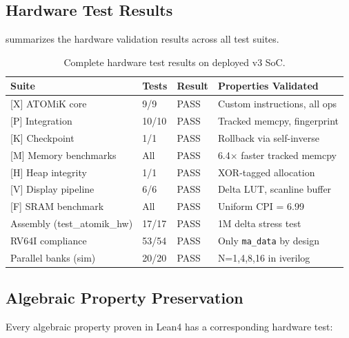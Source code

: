 \documentclass[11pt,letterpaper]{article}
\theoremstyle{plain}
\theoremstyle{definition}
\theoremstyle{remark}
\begin{document}
\subsection{Hardware Test Results}

 summarizes the hardware validation results across all test suites.

\begin{table}[!htbp]
\centering
\caption{Complete hardware test results on deployed v3 SoC.}
\label{tab:hw-tests}
\begin{tabular}{@{}llll@{}}
\toprule
\textbf{Suite} & \textbf{Tests} & \textbf{Result} & \textbf{Properties Validated} \\
\midrule
{[}X{]} ATOMiK core      & 9/9   & PASS & Custom instructions, all ops \\
{[}P{]} Integration       & 10/10 & PASS & Tracked memcpy, fingerprint \\
{[}K{]} Checkpoint         & 1/1   & PASS & Rollback via self-inverse \\
{[}M{]} Memory benchmarks  & All   & PASS & 6.4$\times$ faster tracked memcpy \\
{[}H{]} Heap integrity     & 1/1   & PASS & XOR-tagged allocation \\
{[}V{]} Display pipeline   & 6/6   & PASS & Delta LUT, scanline buffer \\
{[}F{]} SRAM benchmark     & All   & PASS & Uniform CPI = 6.99 \\
Assembly (test\_atomik\_hw) & 17/17 & PASS & 1M delta stress test \\
RV64I compliance          & 53/54 & PASS & Only \texttt{ma\_data} by design \\
Parallel banks (sim)      & 20/20 & PASS & N=1,4,8,16 in iverilog \\
\bottomrule
\end{tabular}
\end{table}

\subsection{Algebraic Property Preservation}

Every algebraic property proven in Lean4 has a corresponding hardware test:
\end{document}
